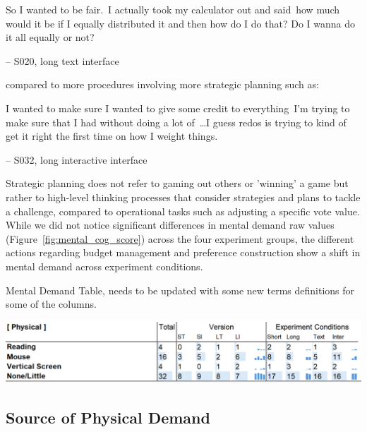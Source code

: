 \begin{displayquote}
So I wanted to be fair.~\bracketellipsis I actually took my calculator out and said~\bracketellipsis  how much would it be if I equally distributed it and then how do I do that? Do I wanna do it all equally or not?

\noindent \hfill -- S020, long text interface
\end{displayquote}

compared to more procedures involving more strategic planning such as:

\begin{displayquote}
I wanted to make sure I wanted to give some credit to everything~\bracketellipsis I'm trying to make sure that I had without doing a lot of~\ldots I guess redos is trying to kind of get it right the first time on how I weight things.

\noindent \hfill -- S032, long interactive interface
\end{displayquote}

Strategic planning does not refer to gaming out others or 'winning' a game but rather to high-level thinking processes that consider strategies and plans to tackle a challenge, compared to operational tasks such as adjusting a specific vote value. While we did not notice significant differences in mental demand raw values (Figure~\ref{fig:mental_cog_score}) across the four experiment groups, the different actions regarding budget management and preference construction show a shift in mental demand across experiment conditions.


\begin{table}[h]
    \caption{Mental Demand Table, needs to be updated with some new terms definitions for some of the columns.}
    \label{tbl:physical}
    \includegraphics[width=\linewidth]{content/image/cog/physical_table.png}
\end{table}
\subsection{Source of Physical Demand} 
\label{sec:physical}


